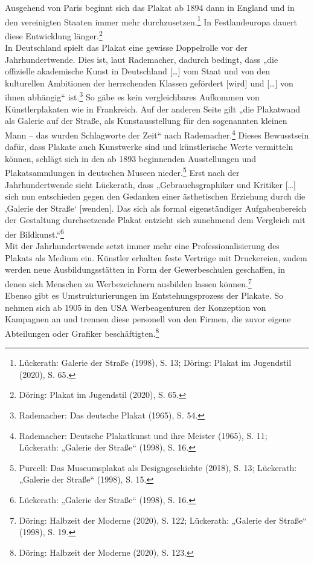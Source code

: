 \documentclass[a4paper,12pt,ngerman]{article}
\begin{document}
Ausgehend von Paris beginnt sich das Plakat ab 1894 dann in England und in den vereinigten Staaten immer mehr durchzusetzen.\footnote{Lückerath: Galerie der Straße (1998), S. 13; Döring: Plakat im Jugendstil (2020), S. 65.}  In Festlandeuropa dauert diese Entwicklung länger.\footnote{Döring: Plakat im Jugendstil (2020), S. 65.} \\
In Deutschland spielt das Plakat eine gewisse Doppelrolle vor der Jahrhundertwende. Dies ist, laut Rademacher, dadurch bedingt, dass „die offizielle akademische Kunst in Deutschland […] vom Staat und von den kulturellen Ambitionen der herrschenden Klassen gefördert [wird] und […] von ihnen abhängig“ ist.\footnote{Rademacher: Das deutsche Plakat (1965), S. 54.}  So gäbe es kein vergleichbares Aufkommen von Künstlerplakaten wie in Frankreich. Auf der anderen Seite gilt „die Plakatwand als Galerie auf der Straße, als Kunstausstellung für den sogenannten kleinen Mann -- das wurden Schlagworte der Zeit“ nach Rademacher.\footnote{Rademacher: Deutsche Plakatkunst und ihre Meister (1965), S. 11; Lückerath: „Galerie der Straße“ (1998), S. 16.}  Dieses Bewusstsein dafür, dass Plakate auch Kunstwerke sind und künstlerische Werte vermitteln können, schlägt sich in den ab 1893 beginnenden Ausstellungen und Plakatsammlungen in deutschen Museen nieder.\footnote{Purcell: Das Museumsplakat als Designgeschichte (2018), S. 13; Lückerath: „Galerie der Straße“ (1998), S. 15.}  Erst nach der Jahrhundertwende sieht Lückerath, dass „Gebrauchsgraphiker und Kritiker […] sich nun entschieden gegen den Gedanken einer ästhetischen Erziehung durch die ‚Galerie der Straße‘ [wenden]. Das sich als formal eigenständiger Aufgabenbereich der Gestaltung durchsetzende Plakat entzieht sich zunehmend dem Vergleich mit der Bildkunst.“\footnote{Lückerath: „Galerie der Straße“ (1998), S. 16.} \\
Mit der Jahrhundertwende setzt immer mehr eine Professionalisierung des Plakats als Medium ein. Künstler erhalten feste Verträge mit Druckereien, zudem werden neue Ausbildungsstätten in Form der Gewerbeschulen geschaffen, in denen sich Menschen zu Werbezeichnern ausbilden lassen können.\footnote{Döring: Halbzeit der Moderne (2020), S. 122; Lückerath: „Galerie der Straße“ (1998), S. 19.} \\
Ebenso gibt es Umstrukturierungen im Entstehungsprozess der Plakate. So nehmen sich ab 1905 in den USA Werbeagenturen der Konzeption von Kampagnen an und trennen diese personell von den Firmen, die zuvor eigene Abteilungen oder Grafiker beschäftigten.\footnote{Döring: Halbzeit der Moderne (2020), S. 123.} \\
\end{document}
